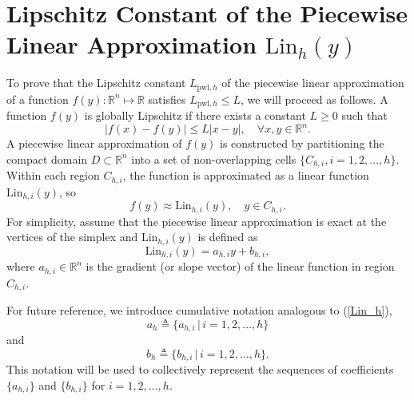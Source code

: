 \documentclass[preprint,12pt]{elsarticle}
\begin{document}
\section[]{Lipschitz Constant of the Piecewise Linear Appro\-xi\-ma\-tion $\text{Lin}_h(y)$}
To prove that the Lipschitz constant \( L_{\text{pwl},h}\) of the piecewise linear approximation of a function \( f({y}) : \mathbb{R}^n \mapsto \mathbb{R} \) satisfies \( L_{\text{pwl},h} \leq L \), we will proceed as follows.
A function \( f({y}) \) is globally Lipschitz if there exists a constant \( L \geq 0 \) such that
\[
|f({x}) - f({y})| \leq L |x-y|, \quad \forall x,y\in \mathbb{R}^n.
\]
A piecewise linear approximation of \( f({y}) \) is constructed by partitioning the compact domain \( D\subset \mathbb{R}^n \) into a set of non-overlapping cells \( \{C_{h,i}, i=1,2,\dots,h\} \). Within each region \( C_{h,i} \), the function is approximated as a linear function \( \text{Lin}_{h,i}({y}) \), so
\[
f({y}) \approx \text{Lin}_{h,i}({y}), \quad {y} \in C_{h,i}.
\]
For simplicity, assume that the piecewise linear approximation is exact at the vertices of the simplex and \( \text{Lin}_{h,i}({y}) \) is defined as
   \[
   \text{Lin}_{h,i}({y}) = {a}_{h,i} {y} + b_{h,i},
   \]
where \( {a}_{h,i}\in \mathbb{R}^n \) is the gradient (or slope vector) of the linear function in region \( C_{h,i} \).

For future reference, we introduce cumulative notation analogous to (\ref{Lin_h}),  
\[
a_h \triangleq \{a_{h,i} \, | \, i = 1, 2, \dots, h\}
\]  
and  
\[
b_h \triangleq \{b_{h,i} \, | \, i = 1, 2, \dots, h\}.
\]  
This notation will be used to collectively represent the sequences of coefficients \( \{a_{h,i}\} \) and \( \{b_{h,i}\} \) for \( i = 1, 2, \dots, h \).
\end{document}
